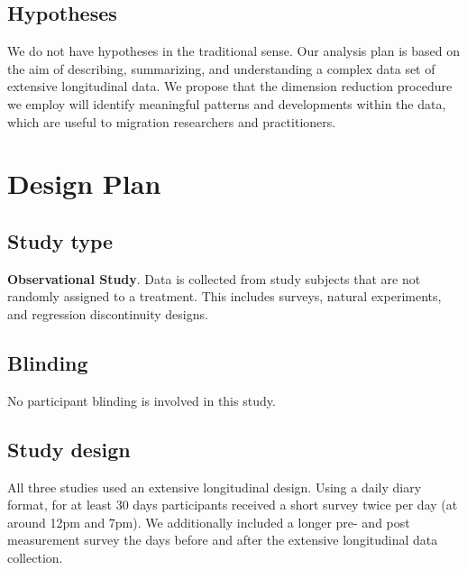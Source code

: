\documentclass[]{article}
\begin{document}
\hypertarget{hypotheses}{%
\subsection{Hypotheses}\label{hypotheses}}

We do not have hypotheses in the traditional sense. Our analysis plan is
based on the aim of describing, summarizing, and understanding a complex
data set of extensive longitudinal data. We propose that the dimension
reduction procedure we employ will identify meaningful patterns and
developments within the data, which are useful to migration researchers
and practitioners.

\hypertarget{design-plan}{%
\section{Design Plan}\label{design-plan}}

\hypertarget{study-type}{%
\subsection{Study type}\label{study-type}}

\textbf{Observational Study}. Data is collected from study subjects that
are not randomly assigned to a treatment. This includes surveys, natural
experiments, and regression discontinuity designs.

\hypertarget{blinding}{%
\subsection{Blinding}\label{blinding}}

No participant blinding is involved in this study.

\hypertarget{study-design}{%
\subsection{Study design}\label{study-design}}

All three
studies
used an extensive longitudinal design. Using a daily diary format, for
at least 30 days participants received a short survey twice per day (at
around 12pm and 7pm). We additionally included a longer pre- and post
measurement survey the days before and after the extensive longitudinal
data collection.
\end{document}
